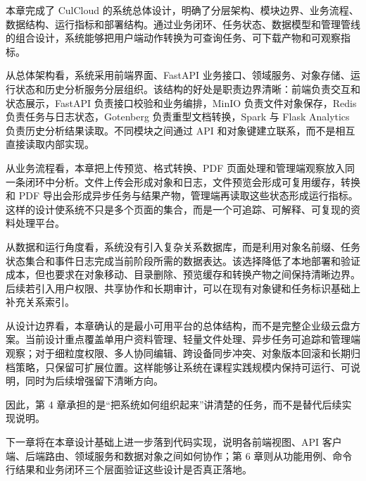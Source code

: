 本章完成了 CulCloud 的系统总体设计，明确了分层架构、模块边界、业务流程、数据结构、运行指标和部署结构。通过业务闭环、任务状态、数据模型和管理管线的组合设计，系统能够把用户端动作转换为可查询任务、可下载产物和可观察指标。

从总体架构看，系统采用前端界面、FastAPI 业务接口、领域服务、对象存储、运行状态和历史分析服务分层组织。该结构的好处是职责边界清晰：前端负责交互和状态展示，FastAPI 负责接口校验和业务编排，MinIO 负责文件对象保存，Redis 负责任务与日志状态，Gotenberg 负责重型文档转换，Spark 与 Flask Analytics 负责历史分析结果读取。不同模块之间通过 API 和对象键建立联系，而不是相互直接读取内部实现。

从业务流程看，本章把上传预览、格式转换、PDF 页面处理和管理端观察放入同一条闭环中分析。文件上传会形成对象和日志，文件预览会形成可复用缓存，转换和 PDF 导出会形成异步任务与结果产物，管理端再读取这些状态形成运行指标。这样的设计使系统不只是多个页面的集合，而是一个可追踪、可解释、可复现的资料处理平台。

从数据和运行角度看，系统没有引入复杂关系数据库，而是利用对象名前缀、任务状态集合和事件日志完成当前阶段所需的数据表达。该选择降低了本地部署和验证成本，但也要求在对象移动、目录删除、预览缓存和转换产物之间保持清晰边界。后续若引入用户权限、共享协作和长期审计，可以在现有对象键和任务标识基础上补充关系索引。

从设计边界看，本章确认的是最小可用平台的总体结构，而不是完整企业级云盘方案。当前设计重点覆盖单用户资料管理、轻量文件处理、异步任务可追踪和管理端观察；对于细粒度权限、多人协同编辑、跨设备同步冲突、对象版本回滚和长期归档策略，只保留可扩展位置。这样能够让系统在课程实践规模内保持可运行、可说明，同时为后续增强留下清晰方向。

因此，第 4 章承担的是“把系统如何组织起来”讲清楚的任务，而不是替代后续实现说明。

下一章将在本章设计基础上进一步落到代码实现，说明各前端视图、API 客户端、后端路由、领域服务和数据对象之间如何协作；第 6 章则从功能用例、命令行结果和业务闭环三个层面验证这些设计是否真正落地。
